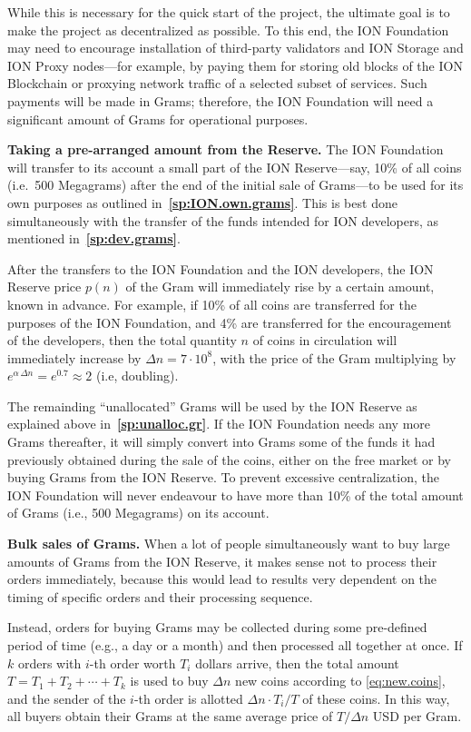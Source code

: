 \documentclass[12pt,oneside]{article}
\def\makepoint#1{\medbreak\noindent{\bf #1.\ }}
\def\nxpoint{\refstepcounter{subsection}%
  \smallbreak\makepoint{\thesubsection}}
\def\nxsubpoint{\refstepcounter{subsubsection}%
  \smallbreak\makepoint{\thesubsubsection}}
\def\refpoint#1{{\rm\textbf{\ref{#1}}}}
\let\ptref=\refpoint
\def\embt(#1.){\textbf{#1.}}
\begin{document}
While this is necessary for the quick start of the project, the
ultimate goal is to make the project as decentralized as possible. To
this end, the ION Foundation may need to encourage installation of
third-party validators and ION Storage and ION Proxy nodes---for
example, by paying them for storing old blocks of the ION Blockchain
or proxying network traffic of a selected subset of services. Such
payments will be made in Grams; therefore, the ION Foundation will
need a significant amount of Grams for operational purposes.

\nxsubpoint \embt(Taking a pre-arranged amount from the Reserve.) The
ION Foundation will transfer to its account a small part of the ION
Reserve---say, 10\% of all coins (i.e.\ 500 Megagrams) after the end
of the initial sale of Grams---to be used for its own purposes as
outlined in~\ptref{sp:ION.own.grams}. This is best done simultaneously
with the transfer of the funds intended for ION developers, as
mentioned in~\ptref{sp:dev.grams}.

After the transfers to the ION Foundation and the ION developers, the
ION Reserve price $p(n)$ of the Gram will immediately rise by a
certain amount, known in advance. For example, if 10\% of all coins
are transferred for the purposes of the ION Foundation, and 4\% are
transferred for the encouragement of the developers, then the total
quantity $n$ of coins in circulation will immediately increase by
$\Delta n=7\cdot10^8$, with the price of the Gram multiplying by
$e^{\alpha\,\Delta n}=e^{0.7}\approx 2$ (i.e, doubling).

The remainding ``unallocated'' Grams will be used by the ION Reserve
as explained above in~\ptref{sp:unalloc.gr}. If the ION Foundation
needs any more Grams thereafter, it will simply convert into Grams
some of the funds it had previously obtained during the sale of the
coins, either on the free market or by buying Grams from the ION
Reserve.  To prevent excessive centralization, the ION Foundation will
never endeavour to have more than 10\% of the total amount of Grams
(i.e., 500 Megagrams) on its account.

\nxpoint\label{sp:bulk.sales} \embt(Bulk sales of Grams.)  When a lot
of people simultaneously want to buy large amounts of Grams from the
ION Reserve, it makes sense not to process their orders immediately,
because this would lead to results very dependent on the timing of
specific orders and their processing sequence.

Instead, orders for buying Grams may be collected during some
pre-defined period of time (e.g., a day or a month) and then processed
all together at once. If $k$ orders with $i$-th order worth $T_i$
dollars arrive, then the total amount $T=T_1+T_2+\cdots+T_k$ is used
to buy $\Delta n$ new coins according to \eqref{eq:new.coins}, and the
sender of the $i$-th order is allotted $\Delta n\cdot T_i/T$ of these
coins. In this way, all buyers obtain their Grams at the same average
price of $T/\Delta n$ USD per Gram.
\end{document}
